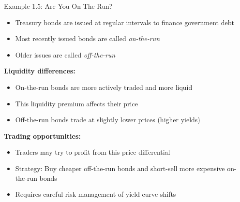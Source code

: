 \documentclass[10pt]{beamer}
\begin{document}
\begin{frame}{Example 1.5: Are You On-The-Run?}
  \begin{itemize}
    \item Treasury bonds are issued at regular intervals to finance government debt
    \item Most recently issued bonds are called \textit{on-the-run}
    \item Older issues are called \textit{off-the-run}
  \end{itemize}
  
  \pause
  \textbf{Liquidity differences:}
  \begin{itemize}
    \item On-the-run bonds are more actively traded and more liquid
    \item This liquidity premium affects their price
    \item Off-the-run bonds trade at slightly lower prices (higher yields)
  \end{itemize}
  
  \pause
  \textbf{Trading opportunities:}
  \begin{itemize}
    \item Traders may try to profit from this price differential
    \item Strategy: Buy cheaper off-the-run bonds and short-sell more expensive on-the-run bonds
    \item Requires careful risk management of yield curve shifts
  \end{itemize}
\end{frame}
\end{document}

